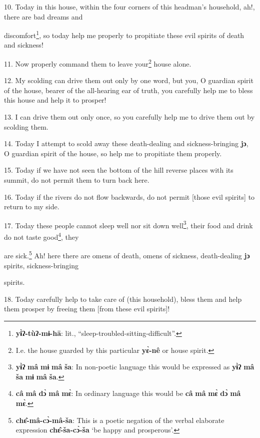 10. Today in this house, within the four corners of this headman's household, ah!,
there are bad dreams and

discomfort\footnote{\textbf{yɨ̀ʔ-tùʔ-mɨ-hā}: lit., ``sleep-troubled-sitting-difficult''.}, so today help me properly to propitiate these evil spirits of death
and sickness!

11. Now properly command them to leave your\footnote{I.e. the house guarded by this particular \textbf{yɛ̀-nê} or house spirit.} house alone.

12. My scolding can drive them out only by one word, but you, O guardian spirit
of the house, bearer of the all-hearing ear of truth, you carefully help me to
bless this house and help it to prosper!

13. I can drive them out only once, so you carefully help me to drive them out
by scolding them.

14. Today I attempt to scold away these death-dealing and sickness-bringing\textbf{
jɔ}, O guardian spirit of the house, so help me to propitiate them properly.

15. Today if we have not seen the bottom of the hill reverse places with its summit,
do not permit them to turn back here.

16. Today if the rivers do not flow backwards, do not permit [those evil spirits]
to return to my side.

17. Today these people cannot sleep well nor sit down well\footnote{\textbf{yɨ̀ʔ} \textbf{mâ} \textbf{mɨ} \textbf{mâ} \textbf{ša}: In non-poetic language this would be expressed as \textbf{yɨ̀ʔ} \textbf{mâ} \textbf{ša} \textbf{mɨ} \textbf{mâ} \textbf{ša}.}, their food and
drink do not taste good\footnote{\textbf{câ} \textbf{mâ} \textbf{dɔ̀} \textbf{mâ} \textbf{mɛ̀}: In ordinary language this would be \textbf{câ} \textbf{mâ} \textbf{mɛ̀} \textbf{dɔ̀} \textbf{mâ} \textbf{mɛ̀}.}, they

are sick.\footnote{\textbf{chɛ̂-mâ-cɔ̀-mâ-ša}: This is a poetic negation of the verbal elaborate expression \textbf{chɛ̂-ša-cɔ̀-ša} `be happy and prosperous'.} Ah! here there are omens of death, omens of sickness, death-dealing
\textbf{jɔ} spirits, sickness-bringing

spirits.

18. Today carefully help to take care of (this household), bless them and help them
prosper by freeing them [from these evil spirits]!

